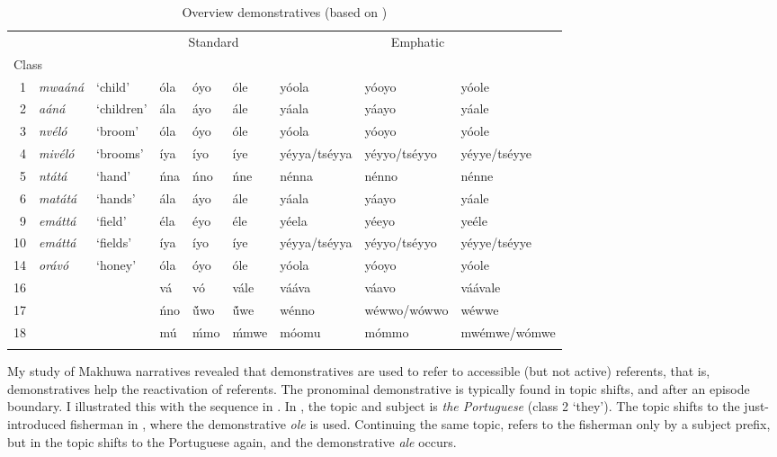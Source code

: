\documentclass[output=paper]{langscibook}
\begin{document}
\begin{table}
\small
\begin{tabular}{r @{~} 
                >{\itshape}l @{~} llll 
                >{\raggedright\arraybackslash}p{} 
                >{\raggedright\arraybackslash}p{} 
                >{\raggedright\arraybackslash}p{} 
                }
\lsptoprule
   &        &             & \multicolumn{3}{c}{Standard} & \multicolumn{3}{c}{Emphatic}\\\cmidrule(lr){4-6}\cmidrule(lr){7-9}
\multicolumn{3}{l}{Class} & \PROX{} & \MED{} & \DIST{} & \PROX{} & \MED{} & \DIST{}\\\midrule
1  & mwaáná & ‘child’     & óla & óyo & óle & yóola & yóoyo & yóole\\
2  & aáná   & ‘children’  & ála & áyo & ále & yáala & yáayo & yáale\\
3  & nvéló  & ‘broom’     & óla & óyo & óle & yóola & yóoyo & yóole\\
4  & mivéló & ‘brooms’    & íya & íyo & íye & yéyya\slash tséyya & yéyyo\slash tséyyo & yéyye\slash tséyye\\
5  & ntátá  & ‘hand’      & ńna & ńno & ńne & nénna & nénno & nénne\\
6  & matátá & ‘hands’     & ála & áyo & ále & yáala & yáayo & yáale\\
9  & emáttá & ‘field’     & éla & éyo & éle & yéela & yéeyo & yeéle\\
10 & emáttá & ‘fields’    & íya & íyo & íye & yéyya\slash tséyya & yéyyo\slash tséyyo & yéyye\slash tséyye\\
14 & orávó  & ‘honey’     & óla & óyo & óle & yóola & yóoyo & yóole\\
16 &        &             & vá & vó & vále & vááva & váavo & váávale\\
17 &        &             & ńno & \'{\~u}wo & \'{\~u}we & wénno & wéwwo\slash wówwo & wéwwe\\
18 &        &             & mú & ḿmo & ḿmwe & móomu & mómmo & mwémwe\slash wómwe\\
\lspbottomrule
\end{tabular}
\caption{\label{bkm:Ref252212434}Overview demonstratives (based on \citealt[47]{vanderWal2009a})}

\end{table}

My study of Makhuwa narratives \citep{vanderWal2010} revealed that demonstratives are used to refer to accessible (but not active) referents, that is, demonstratives help the reactivation of referents. The pronominal demonstrative is typically found in topic shifts, and after an episode boundary. I illustrated this with the sequence in  \citep[197]{vanderWal2010}. In , the topic and subject is \textit{the Portuguese} (class 2 ‘they’). The topic shifts to the just-introduced fisherman in , where the demonstrative \textit{ole} is used. Continuing the same topic,  refers to the fisherman only by a subject prefix, but in  the topic shifts to the Portuguese again, and the demonstrative \textit{ale} occurs.
\end{document}
